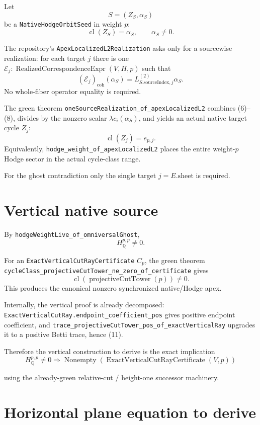 \documentclass[11pt]{article}
\newcommand{\Q}{\mathbb Q}
\begin{document}
Let
\[
 S=(Z_S,\alpha_S)
\]
be a \texttt{NativeHodgeOrbitSeed} in weight $p$:
\[
 \operatorname{cl}(Z_S)=\alpha_S,\qquad \alpha_S\neq0. \tag{7}
\]

The repository's
\texttt{ApexLocalizedL2Realization} asks only for a sourcewise realization:
for each target $j$ there is one
$\mathcal E_j:\operatorname{RealizedCorrespondenceExpr}(V,H,p)$ such that
\[
 (\mathcal E_j)_{\mathrm{coh}}(\alpha_S)
 =
 L^{(2)}_{S.\mathrm{sourceIndex},j}\alpha_S. \tag{8}
\]
No whole-fiber operator equality is required.

The green theorem \texttt{oneSourceRealization\_of\_apexLocalizedL2}
combines (6)--(8), divides by the nonzero scalar
$\lambda c_i(\alpha_S)$, and yields an actual native target cycle $Z_j$:
\[
 \operatorname{cl}(Z_j)=e_{p,j}. \tag{9}
\]
Equivalently, \texttt{hodge\_weight\_of\_apexLocalizedL2} places the
entire weight-$p$ Hodge sector in the actual cycle-class range.

For the ghost contradiction only the single target
$j=E.\mathrm{sheet}$ is required.

\section{Vertical native source}

By \texttt{hodgeWeightLive\_of\_omniversalGhost},
\[
 H^{p,p}_{\Q}\neq0. \tag{10}
\]

For an \texttt{ExactVerticalCutRayCertificate} $C_p$, the green theorem
\texttt{cycleClass\_projectiveCutTower\_ne\_zero\_of\_certificate}
gives
\[
 \operatorname{cl}(\operatorname{projectiveCutTower}(p))\neq0. \tag{11}
\]
This produces the canonical nonzero synchronized native/Hodge apex.

Internally, the vertical proof is already decomposed:
\texttt{ExactVerticalCutRay.endpoint\_coefficient\_pos} gives positive
endpoint coefficient, and
\texttt{trace\_projectiveCutTower\_pos\_of\_exactVerticalRay} upgrades it
to a positive Betti trace, hence (11).

Therefore the vertical construction to derive is the exact implication
\[
 \boxed{
 H^{p,p}_{\Q}\neq0
 \Longrightarrow
 \operatorname{Nonempty}
   (\operatorname{ExactVerticalCutRayCertificate}(V,p))
 } \tag{V}
\]

using the already-green relative-cut / height-one successor machinery.

\section{Horizontal plane equation to derive}
\end{document}
